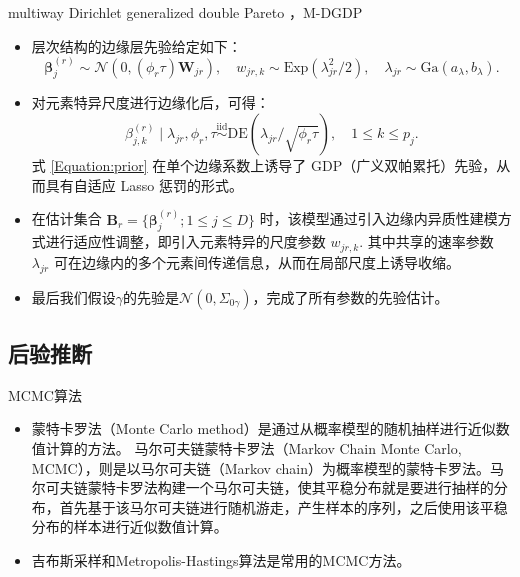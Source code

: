 \documentclass{beamer}
\begin{document}
	\begin{frame}{multiway Dirichlet generalized double Pareto ，M-DGDP}
		\begin{itemize}
			\item 层次结构的边缘层先验给定如下：
			\begin{equation}
				\bm{\beta}^{(r)}_j \sim \mathcal{N}(0, (\phi_r \tau) \bm{W}_{jr}), 
				\quad w_{jr,k} \sim \mathrm{Exp}(\lambda_{jr}^2 / 2), 
				\quad \lambda_{jr} \sim \mathrm{Ga}(a_\lambda, b_\lambda).
				\label{Equation:prior}
			\end{equation}
			\item 对元素特异尺度进行边缘化后，可得：
			\[
			\beta^{(r)}_{j,k} \mid \lambda_{jr}, \phi_r, \tau \overset{\text{iid}}{\sim} \mathrm{DE}(\lambda_{jr} / \sqrt{\phi_r \tau}), \quad 1 \leq k \leq p_j.
			\]
			式 \eqref{Equation:prior} 在单个边缘系数上诱导了 GDP（广义双帕累托）先验，从而具有自适应 Lasso 惩罚的形式。
			\item 在估计集合 \( \bm{B}_r = \{ \bm{\beta}_j^{(r)}; 1 \leq j \leq D \} \) 时，该模型通过引入边缘内异质性建模方式进行适应性调整，即引入元素特异的尺度参数 \( w_{jr,k} \). 其中共享的速率参数 \( \lambda_{jr} \) 可在边缘内的多个元素间传递信息，从而在局部尺度上诱导收缩。
			\item 最后我们假设$\gamma$的先验是$\mathcal{N}(0,\Sigma_{0\gamma})$，完成了所有参数的先验估计。
		\end{itemize}
	\end{frame}
	\subsection{后验推断}
	\begin{frame}{MCMC算法}
		\begin{itemize}[<+->]
			\item 蒙特卡罗法（Monte Carlo method）是通过从概率模型的随机抽样进行近似数值计算的方法。 马尔可夫链蒙特卡罗法（Markov Chain Monte Carlo, MCMC），则是以马尔可夫链（Markov chain）为概率模型的蒙特卡罗法。马尔可夫链蒙特卡罗法构建一个马尔可夫链，使其平稳分布就是要进行抽样的分布，首先基于该马尔可夫链进行随机游走，产生样本的序列，之后使用该平稳分布的样本进行近似数值计算。
			\item 吉布斯采样和Metropolis-Hastings算法是常用的MCMC方法。
		\end{itemize}
	\end{frame}
	
\end{document}
